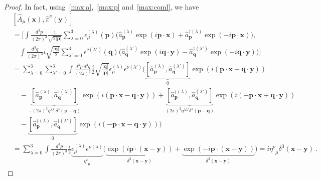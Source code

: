    \begin{proof}
        In fact, using~\eqref{max:a},~\eqref{max:p} and~\eqref{max:coml}, we have
        \begin{equation*}
        \begin{aligned}
            & [\hat A_\mu (\mathbf x), \hat \pi^\nu (\mathbf y)] \\ & = [\int \frac{d^3 p}{(2\pi)^3} \frac{1}{\sqrt{2 |\mathbf p|}} \sum_{\lambda=0}^{3} \epsilon_\mu^{(\lambda)} (\mathbf p) \Big ( \hat a_{\mathbf p}^{(\lambda)} \exp(i \mathbf p \cdot \mathbf x) + \hat a_{\mathbf p}^{\dagger (\lambda)} \exp(- i \mathbf p \cdot \mathbf x) \Big), \\ & \quad \int \frac{d^3 q}{(2\pi)^3} i \sqrt{\frac{|\mathbf q|}{2}} \sum_{\lambda'=0}^{3} \epsilon^{\nu(\lambda')} (\mathbf q) \Big ( \hat a_{\mathbf q}^{(\lambda')}  \exp(i \mathbf q \cdot \mathbf y) - \hat a_{\mathbf q}^{\dagger (\lambda')} \exp(- i \mathbf q \cdot \mathbf y) \Big)] \\ & = \sum_{\lambda=0}^{3} \sum_{\lambda'=0}^{3} \int \frac{d^3 p ~ d^3 q}{(2\pi)^6} \frac{i}{2} \sqrt{\frac{|\mathbf q|}{|\mathbf p|}} \epsilon_\mu^{(\lambda)} \epsilon^{\nu(\lambda')} \Big ( \underbrace{[\hat a_{\mathbf p}^{(\lambda)} , \hat a_{\mathbf q}^{(\lambda')}]}_0 \exp(i (\mathbf p \cdot \mathbf x + \mathbf q \cdot \mathbf y)) \\ & \quad - \underbrace{[\hat a_{\mathbf p}^{(\lambda)} , \hat a_{\mathbf q}^{\dagger (\lambda')}]}_{- (2\pi)^3 \eta^{\lambda \lambda'} \delta^3 (\mathbf p - \mathbf q)} \exp(i (\mathbf p \cdot \mathbf x - \mathbf q \cdot \mathbf y)) + \underbrace{[\hat a_{\mathbf p}^{\dagger (\lambda)} , \hat a_{\mathbf q}^{(\lambda')}]}_{(2\pi)^3 \eta^{\lambda \lambda'} \delta^3 (\mathbf p - \mathbf q)} \exp(i (- \mathbf p \cdot \mathbf x + \mathbf q \cdot \mathbf y)) \\ & \quad - \underbrace{[\hat a_{\mathbf p}^{\dagger(\lambda)} , \hat a_{\mathbf q}^{\dagger(\lambda')}]}_0 \exp(i (- \mathbf p \cdot \mathbf x - \mathbf q \cdot \mathbf y)) \Big) \\ & = \sum_{\lambda=0}^{3} \int \frac{d^3 p}{(2\pi)^3} \frac{i}{2} \underbrace{\epsilon_\mu^{(\lambda)} \epsilon^{\nu(\lambda)}}_{\eta^\nu_{\phantom \nu \mu}} \Big ( \underbrace{\exp(i \mathbf p \cdot (\mathbf x - \mathbf y))}_{\delta^3 (\mathbf x - \mathbf y)} + \underbrace{\exp(- i \mathbf p \cdot (\mathbf x - \mathbf y))}_{\delta^3 (\mathbf x - \mathbf y)} \Big) = i \eta^\nu_{\phantom \nu \mu} \delta^3 (\mathbf x - \mathbf y) ~.
        \end{aligned}
        \end{equation*}
    \end{proof}

